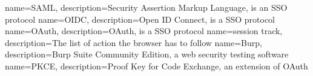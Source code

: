 

{
    name=SAML,
    description={Security Assertion Markup Language, is an SSO protocol}
}
{
    name=OIDC,
    description={Open ID Connect, is a SSO protocol} 
}
{
    name=OAuth,
    description={OAuth, is a SSO protocol}
}
{
    name=session track,
    description={The list of action the browser has to follow}
}
{
    name=Burp,
    description={Burp Suite Community Edition, a web security testing software}
}
{
    name=PKCE,
    description={Proof Key for Code Exchange, an extension of OAuth}
}


\makeglossaries